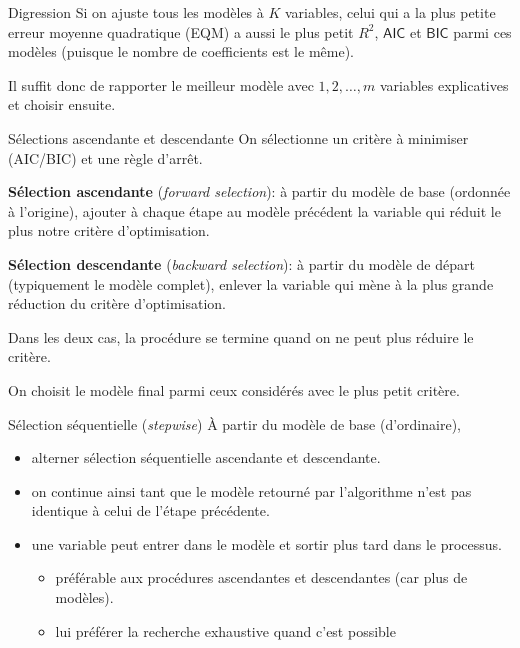 \documentclass[
  ignorenonframetext,
]{beamer}
\providecommand{\tightlist}{%
  \setlength{\itemsep}{0pt}\setlength{\parskip}{0pt}}
\begin{document}
\begin{frame}{Digression}
\protect{}\label{digression}
Si on ajuste tous les modèles à \(K\) variables, celui qui a la plus
petite erreur moyenne quadratique (EQM) a aussi le plus petit \(R^2\),
\(\mathsf{AIC}\) et \(\mathsf{BIC}\) parmi ces modèles (puisque le
nombre de coefficients est le même).

Il suffit donc de rapporter le meilleur modèle avec \(1,2,\ldots, m\)
variables explicatives et choisir ensuite.
\end{frame}

\begin{frame}{Sélections ascendante et descendante}
\protect{}\label{suxe9lections-ascendante-et-descendante}
On sélectionne un critère à minimiser (AIC/BIC) et une règle d'arrêt.

\textbf{Sélection ascendante} (\emph{forward selection}): à partir du
modèle de base (ordonnée à l'origine), ajouter à chaque étape au modèle
précédent la variable qui réduit le plus notre critère d'optimisation.

\textbf{Sélection descendante} (\emph{backward selection}): à partir du
modèle de départ (typiquement le modèle complet), enlever la variable
qui mène à la plus grande réduction du critère d'optimisation.

Dans les deux cas, la procédure se termine quand on ne peut plus réduire
le critère.

On choisit le modèle final parmi ceux considérés avec le plus petit
critère.
\end{frame}

\begin{frame}{Sélection séquentielle (\emph{stepwise})}
\protect{}\label{suxe9lection-suxe9quentielle-stepwise}
À partir du modèle de base (d'ordinaire),

\begin{itemize}
\tightlist
\item
  alterner sélection séquentielle ascendante et descendante.
\item
  on continue ainsi tant que le modèle retourné par l'algorithme n'est
  pas identique à celui de l'étape précédente.
\item
  une variable peut entrer dans le modèle et sortir plus tard dans le
  processus.

  \begin{itemize}
  \tightlist
  \item
    préférable aux procédures ascendantes et descendantes (car plus de
    modèles).
  \item
    lui préférer la recherche exhaustive quand c'est possible
  \end{itemize}
\end{itemize}
\end{frame}
\end{document}
